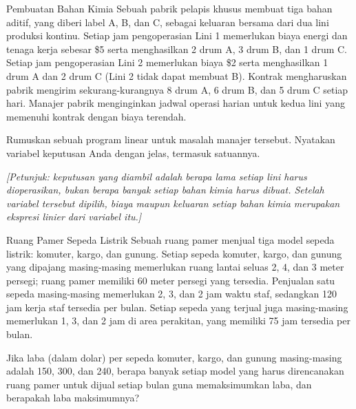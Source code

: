 \begin{ex}{Pembuatan Bahan Kimia}{}
\label{ex:ChemicalPlant}
 Sebuah pabrik pelapis khusus membuat tiga bahan aditif, yang diberi label A, B, dan C, sebagai keluaran bersama dari dua lini produksi kontinu. Setiap jam pengoperasian Lini 1 memerlukan biaya energi dan tenaga kerja sebesar \$5 serta menghasilkan 2 drum A, 3 drum B, dan 1 drum C. Setiap jam pengoperasian Lini 2 memerlukan biaya \$2 serta menghasilkan 1 drum A dan 2 drum C (Lini 2 tidak dapat membuat B). Kontrak mengharuskan pabrik mengirim sekurang-kurangnya 8 drum A, 6 drum B, dan 5 drum C setiap hari. Manajer pabrik menginginkan jadwal operasi harian untuk kedua lini yang memenuhi kontrak dengan biaya terendah.

Rumuskan sebuah program linear untuk masalah manajer tersebut. Nyatakan variabel keputusan Anda dengan jelas, termasuk satuannya.

\emph{[Petunjuk: keputusan yang diambil adalah berapa lama setiap lini harus dioperasikan, bukan berapa banyak setiap bahan kimia harus dibuat. Setelah variabel tersebut dipilih, biaya maupun keluaran setiap bahan kimia merupakan ekspresi linier dari variabel itu.]}
\label{exer:ChemicalPlant}
\end{ex}

\begin{ex}{Ruang Pamer Sepeda Listrik}{}
\label{ex:ebike-showroom}
 Sebuah ruang pamer menjual tiga model sepeda listrik: komuter, kargo, dan gunung. Setiap sepeda komuter, kargo, dan gunung yang dipajang masing-masing memerlukan ruang lantai seluas 2, 4, dan 3 meter persegi; ruang pamer memiliki 60 meter persegi yang tersedia. Penjualan satu sepeda masing-masing memerlukan 2, 3, dan 2 jam waktu staf, sedangkan 120 jam kerja staf tersedia per bulan. Setiap sepeda yang terjual juga masing-masing memerlukan 1, 3, dan 2 jam di area perakitan, yang memiliki 75 jam tersedia per bulan.

Jika laba (dalam dolar) per sepeda komuter, kargo, dan gunung masing-masing adalah 150, 300, dan 240, berapa banyak setiap model yang harus direncanakan ruang pamer untuk dijual setiap bulan guna memaksimumkan laba, dan berapakah laba maksimumnya?
\end{ex}

